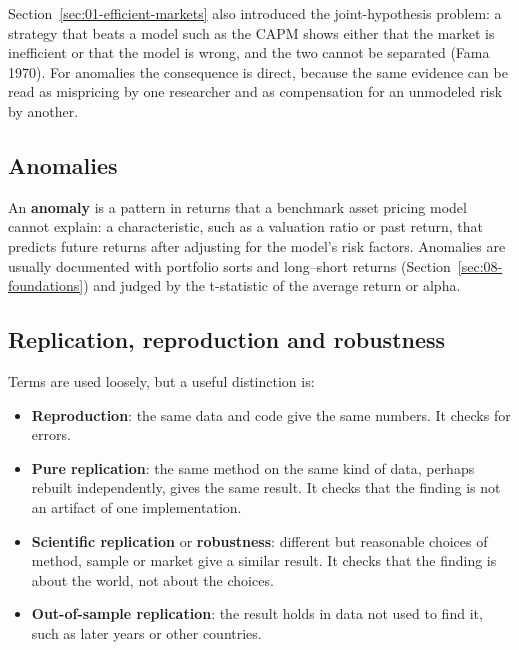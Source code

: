 Section~\ref{sec:01-efficient-markets} also introduced the joint-hypothesis problem: a strategy that beats a model such as the CAPM shows either that the market is inefficient or that the model is wrong, and the two cannot be separated (Fama 1970). For anomalies the consequence is direct, because the same evidence can be read as mispricing by one researcher and as compensation for an unmodeled risk by another.

\subsection{Anomalies}

An \textbf{anomaly} is a pattern in returns that a benchmark asset pricing model cannot explain: a characteristic, such as a valuation ratio or past return, that predicts future returns after adjusting for the model's risk factors. Anomalies are usually documented with portfolio sorts and long--short returns (Section~\ref{sec:08-foundations}) and judged by the t-statistic of the average return or alpha.

\subsection{Replication, reproduction and robustness}

Terms are used loosely, but a useful distinction is:

\begin{itemize}
  \item \textbf{Reproduction}: the same data and code give the same numbers. It checks for errors.
  \item \textbf{Pure replication}: the same method on the same kind of data, perhaps rebuilt independently, gives the same result. It checks that the finding is not an artifact of one implementation.
  \item \textbf{Scientific replication} or \textbf{robustness}: different but reasonable choices of method, sample or market give a similar result. It checks that the finding is about the world, not about the choices.
  \item \textbf{Out-of-sample replication}: the result holds in data not used to find it, such as later years or other countries.
\end{itemize}


